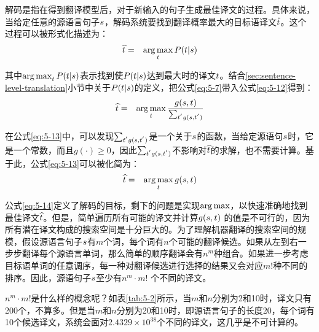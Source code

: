\parinterval 解码是指在得到翻译模型后，对于新输入的句子生成最佳译文的过程。具体来说，当给定任意的源语言句子${s}$，解码系统要找到翻译概率最大的目标语译文$\hat{{t}}$。这个过程可以被形式化描述为：
\begin{eqnarray}
\widehat{{t}}&=&\operatorname*{arg\,max}_{{t}} {P}({t}|{s})
\label{eq:5-12}
\end{eqnarray}

\noindent  其中$\operatorname*{arg\,max}_{{t}} {P}({t}|{s})$表示找到使${P}({t}|{s})$达到最大时的译文${t}$。结合\ref{sec:sentence-level-translation}小节中关于${P}({t}|{s})$的定义，把公式\eqref{eq:5-7}带入公式\eqref{eq:5-12}得到：
\begin{eqnarray}
\widehat{{t}}&=&\operatorname*{arg\,max}_{{t}}\frac{g({s},{t})}{\sum_{{t}^{'}g({s},{t}^{'})}}
\label{eq:5-13}
\end{eqnarray}

\parinterval 在公式\eqref{eq:5-13}中，可以发现${\sum_{{t}^{'}g({s},{t}^{'})}}$是一个关于${s}$的函数，当给定源语句${s}$时，它是一个常数，而且$g(\cdot) \ge 0$，因此${\sum_{{t}^{'}g({s},{t}^{'})}}$不影响对$\widehat{{t}}$的求解，也不需要计算。基于此，公式\eqref{eq:5-13}可以被化简为：
\begin{eqnarray}
\widehat{{t}}&=&\operatorname*{arg\,max}_{{t}}g({s},{t})
\label{eq:5-14}
\end{eqnarray}

\parinterval 公式\eqref{eq:5-14}定义了解码的目标，剩下的问题是实现$\operatorname*{arg\,max}$，以快速准确地找到最佳译文$\widehat{{t}}$。但是，简单遍历所有可能的译文并计算$g({s},{t})$ 的值是不可行的，因为所有潜在译文构成的搜索空间是十分巨大的。为了理解机器翻译的搜索空间的规模，假设源语言句子${s}$有$m$个词，每个词有$n$个可能的翻译候选。如果从左到右一步步翻译每个源语言单词，那么简单的顺序翻译会有$n^m$种组合。如果进一步考虑目标语单词的任意调序，每一种对翻译候选进行选择的结果又会对应$m!$种不同的排序。因此，源语句子${s}$至少有$n^m \cdot m!$ 个不同的译文。

\parinterval $n^{m}\cdot m!$是什么样的概念呢？如表\ref{tab:5-2}所示，当$m$和$n$分别为2和10时，译文只有200个，不算多。但是当$m$和$n$分别为20和10时，即源语言句子的长度20，每个词有10个候选译文，系统会面对$2.4329 \times 10^{38}$个不同的译文，这几乎是不可计算的。

